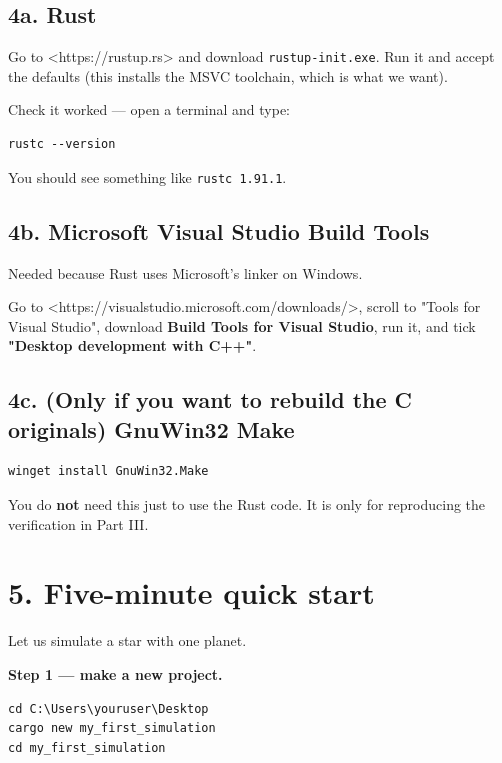 \documentclass[11pt]{article}
\begin{document}
\subsection{4a. Rust}

Go to <https://rustup.rs> and download \texttt{rustup-init.exe}. Run it and accept the defaults (this installs the MSVC toolchain, which is what we want).

Check it worked --- open a terminal and type:

\begin{lstlisting}
rustc --version
\end{lstlisting}

You should see something like \texttt{rustc 1.91.1}.

\subsection{4b. Microsoft Visual Studio Build Tools}

Needed because Rust uses Microsoft's linker on Windows.

Go to <https://visualstudio.microsoft.com/downloads/>, scroll to "Tools for Visual Studio", download \textbf{Build Tools for Visual Studio}, run it, and tick \textbf{"Desktop development with C++"}.

\subsection{4c. (Only if you want to rebuild the C originals) GnuWin32 Make}

\begin{lstlisting}
winget install GnuWin32.Make
\end{lstlisting}

You do \textbf{not} need this just to use the Rust code. It is only for reproducing the verification in Part III.

\section{5. Five-minute quick start}

Let us simulate a star with one planet.

\textbf{Step 1 --- make a new project.}

\begin{lstlisting}
cd C:\Users\youruser\Desktop
cargo new my_first_simulation
cd my_first_simulation
\end{lstlisting}
\end{document}
